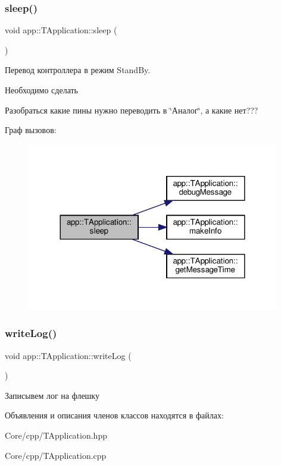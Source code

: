 \subsubsection{\texorpdfstring{sleep()}{sleep()}}
{\footnotesize\ttfamily void app\+::\+T\+Application\+::sleep (\begin{DoxyParamCaption}{ }\end{DoxyParamCaption})}



Перевод контроллера в режим Stand\+By. 



 \begin{DoxyRefDesc}{Необходимо сделать}
\item[\hyperlink{todo__todo000003}{Необходимо сделать}]Разобраться какие пины нужно переводить в \char`\"{}Аналог\char`\"{}, а какие нет??? \end{DoxyRefDesc}
Граф вызовов\+:\nopagebreak
\begin{figure}[H]
\begin{center}
\leavevmode
\includegraphics[width=312pt]{classapp_1_1_t_application_ab44dd5aa2afe1d66b2588e908bfad4d0_cgraph}
\end{center}
\end{figure}
\mbox{\label{classapp_1_1_t_application_a8c4bf0b62709ad4abd9c9027f1f58106}} 
\subsubsection{\texorpdfstring{write\+Log()}{writeLog()}}
{\footnotesize\ttfamily void app\+::\+T\+Application\+::write\+Log (\begin{DoxyParamCaption}{ }\end{DoxyParamCaption})}



Записывем лог на флешку 



 

Объявления и описания членов классов находятся в файлах\+:\begin{DoxyCompactItemize}
\item 
Core/cpp/T\+Application.\+hpp\item 
Core/cpp/T\+Application.\+cpp\end{DoxyCompactItemize}
